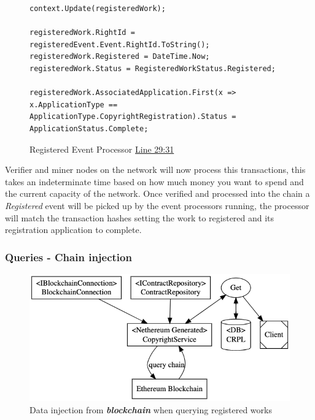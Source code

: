 \documentclass[12pt]{article}
\newcommand{\keyword}[1]{\textbf{\textit{#1}}}
\begin{document}
\begin{figure}[H]
\caption{Registered Event Processor \href{https://github.com/MrHarrisonBarker/CRPL/blob/main/CRPL.Web/Core/EventProcessors/RegisteredEventProcessor.cs}{Line 29:31}}
\centering
\begin{lstlisting}[language=CSharp]
context.Update(registeredWork);

registeredWork.RightId = registeredEvent.Event.RightId.ToString();
registeredWork.Registered = DateTime.Now;
registeredWork.Status = RegisteredWorkStatus.Registered;

registeredWork.AssociatedApplication.First(x => x.ApplicationType == ApplicationType.CopyrightRegistration).Status = ApplicationStatus.Complete;	
\end{lstlisting}
\end{figure}

Verifier and miner nodes on the network will now process this transactions, this takes an indeterminate time based on how much money you want to spend and the current capacity of the network. Once verified and processed into the chain a \textit{Registered} event will be picked up by the event processors running, the processor will match the transaction hashes setting the work to registered and its registration application to complete.

\subsubsection{Queries - Chain injection}

\begin{figure}[H]
\caption{Data injection from \keyword{blockchain} when querying registered works}
\centering
\includegraphics[width=\textwidth,height=\textheight,keepaspectratio]{images/operational/chain-inject}
\end{figure}
\end{document}
